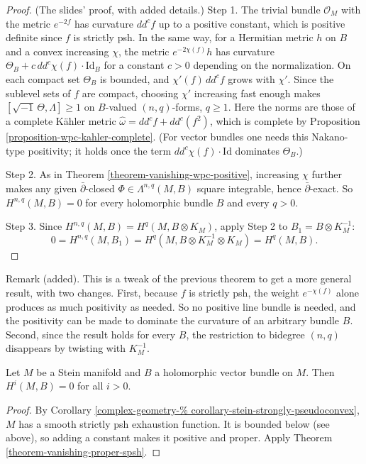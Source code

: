 \begin{proof}
(The slides' proof, with added details.)
Step 1. The trivial bundle
$\mathcal{O}_M$ with the metric $e^{-2f}$ has
curvature $dd^cf$ up to a positive constant,
which is positive definite since $f$ is
strictly psh. In the same way, for a
Hermitian metric $h$ on $B$ and a convex
increasing $\chi$, the metric
$e^{-2\chi(f)}h$ has curvature
$\Theta_B+c\,dd^c\chi(f)\cdot\mathrm{Id}_B$
for a constant $c>0$ depending on the
normalization. On each compact set $\Theta_B$
is bounded, and $\chi'(f)\,dd^cf$ grows with
$\chi'$. Since the sublevel sets of $f$ are
compact, choosing $\chi'$ increasing fast
enough makes
$[\sqrt{-1}\,\Theta,\Lambda]\geq1$ on
$B$-valued $(n,q)$-forms, $q\geq1$. Here the
norms are those of a complete K\"ahler metric
$\hat\omega=dd^cf+dd^c(f^2)$, which is
complete by Proposition
\ref{proposition-wpc-kahler-complete}. (For
vector bundles one needs this Nakano-type
positivity; it holds once the term
$dd^c\chi(f)\cdot\mathrm{Id}$ dominates
$\Theta_B$.)

Step 2. As in Theorem
\ref{theorem-vanishing-wpc-positive},
increasing $\chi$ further makes any given
$\bar\partial$-closed
$\Phi\in\Lambda^{n,q}(M,B)$ square
integrable, hence $\bar\partial$-exact. So
$H^{n,q}(M,B)=0$ for every holomorphic bundle
$B$ and every $q>0$.

Step 3. Since $H^{n,q}(M,B)=H^q(M,B\otimes
K_M)$, apply Step 2 to $B_1=B\otimes
K_M^{-1}$:
$$
0=H^{n,q}(M,B_1)=H^q(M
,B\otimes K_M^{-1}\otimes K_M)=H^q(M,B).
$$
\end{proof}

\noindent
Remark (added). This is a tweak of the
previous theorem to get a more general
result, with two changes.
First, because $f$ is strictly psh, the
weight $e^{-\chi(f)}$ alone produces as much
positivity as needed. So no positive line
bundle is needed, and the positivity can be
made to dominate the curvature of an
arbitrary bundle $B$. Second, since the
result holds for every $B$, the restriction
to bidegree $(n,q)$ disappears by twisting
with $K_M^{-1}$.

\begin{corollary}
\label{corollary-stein-vanishing-bundles}
Let $M$ be a Stein manifold and $B$ a
holomorphic vector bundle on $M$. Then
$H^i(M,B)=0$ for all $i>0$.
\end{corollary}

\begin{proof}
By Corollary
\ref{complex-geometry-%
corollary-stein-strongly-pseudoconvex},
$M$ has a smooth strictly psh exhaustion
function. It is bounded below (see above), so
adding a constant makes it positive and
proper. Apply Theorem
\ref{theorem-vanishing-proper-spsh}.
\end{proof}

